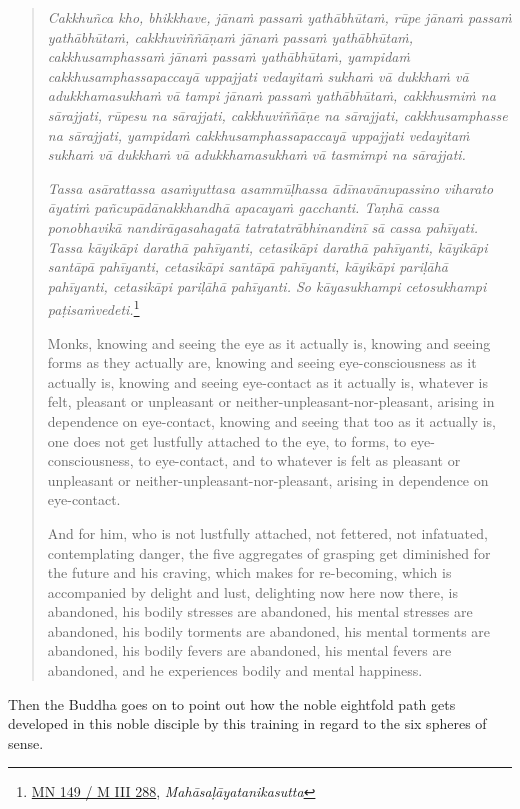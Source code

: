 \begin{quote}
\emph{Cakkhuñca kho, bhikkhave, jānaṁ passaṁ yathābhūtaṁ, rūpe jānaṁ passaṁ yathābhūtaṁ, cakkhuviññāṇaṁ jānaṁ passaṁ yathābhūtaṁ, cakkhusamphassaṁ jānaṁ passaṁ yathābhūtaṁ, yampidaṁ cakkhusamphassapaccayā uppajjati vedayitaṁ sukhaṁ vā dukkhaṁ vā adukkhamasukhaṁ vā tampi jānaṁ passaṁ yathābhūtaṁ, cakkhusmiṁ na sārajjati, rūpesu na sārajjati, cakkhuviññāṇe na sārajjati, cakkhusamphasse na sārajjati, yampidaṁ cakkhusamphassapaccayā uppajjati vedayitaṁ sukhaṁ vā dukkhaṁ vā adukkhamasukhaṁ vā tasmimpi na sārajjati.}

\emph{Tassa asārattassa asaṁyuttasa asammūḷhassa ādīnavānupassino viharato āyatiṁ pañcupādānakkhandhā apacayaṁ gacchanti. Taṇhā cassa ponobhavikā nandirāgasahagatā tatratatrābhinandinī sā cassa pahīyati. Tassa kāyikāpi darathā pahīyanti, cetasikāpi darathā pahīyanti, kāyikāpi santāpā pahīyanti, cetasikāpi santāpā pahīyanti, kāyikāpi pariḷāhā pahīyanti, cetasikāpi pariḷāhā pahīyanti. So kāyasukhampi cetosukhampi paṭisaṁvedeti.}\footnote{\href{https://suttacentral.net/mn149/pli/ms}{MN 149 / M III 288}, \emph{Mahāsaḷāyatanikasutta}}

Monks, knowing and seeing the eye as it actually is, knowing and seeing forms as they actually are, knowing and seeing eye-consciousness as it actually is, knowing and seeing eye-contact as it actually is, whatever is felt, pleasant or unpleasant or neither-unpleasant-nor-pleasant, arising in dependence on eye-contact, knowing and seeing that too as it actually is, one does not get lustfully attached to the eye, to forms, to eye-consciousness, to eye-contact, and to whatever is felt as pleasant or unpleasant or neither-unpleasant-nor-pleasant, arising in dependence on eye-contact.

And for him, who is not lustfully attached, not fettered, not infatuated, contemplating danger, the five aggregates of grasping get diminished for the future and his craving, which makes for re-becoming, which is accompanied by delight and lust, delighting now here now there, is abandoned, his bodily stresses are abandoned, his mental stresses are abandoned, his bodily torments are abandoned, his mental torments are abandoned, his bodily fevers are abandoned, his mental fevers are abandoned, and he experiences bodily and mental happiness.
\end{quote}

Then the Buddha goes on to point out how the noble eightfold path gets developed in this noble disciple by this training in regard to the six spheres of sense.

